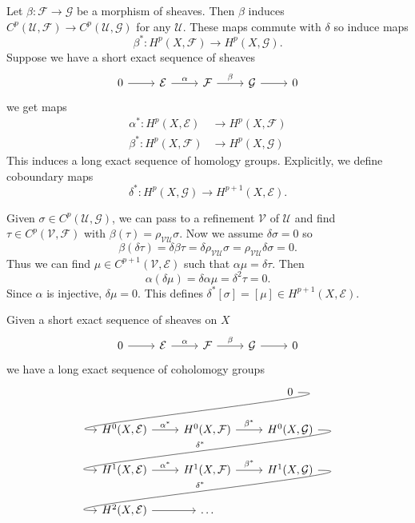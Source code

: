 \documentclass[a4paper]{article}
\begin{document}
Let \(\beta: \mathcal F \to \mathcal G\) be a morphism of sheaves. Then \(\beta\) induces \(C^p(\mathcal U, \mathcal F) \to C^p(\mathcal U, \mathcal G)\) for any \(\mathcal U\). These maps commute with \(\delta\) so induce maps
\[
  \beta^*: H^p(X, \mathcal F) \to H^p(X, \mathcal G).
\]
Suppose we have a short exact sequence of sheaves
\[
  \begin{tikzcd}
    0 \ar[r] & \mathcal E \ar[r, "\alpha"] & \mathcal F \ar[r, "\beta"] & \mathcal G \ar[r] & 0
  \end{tikzcd}
\]
we get maps
\begin{align*}
  \alpha^*: H^p(X, \mathcal E) &\to H^p(X, \mathcal F) \\
  \beta^*: H^p(X, \mathcal F) &\to H^p(X, \mathcal G)
\end{align*}
This induces a long exact sequence of homology groups. Explicitly, we define coboundary maps
\[
  \delta^*: H^p(X, \mathcal G) \to H^{p + 1}(X, \mathcal E).
\]

Given \(\sigma \in C^p(\mathcal U, \mathcal G)\), we can pass to a refinement \(\mathcal V\) of \(\mathcal U\) and find \(\tau \in C^p(\mathcal V, \mathcal F)\) with \(\beta(\tau) = \rho_{\mathcal V \mathcal U} \sigma\). Now we assume \(\delta \sigma = 0\) so
\[
  \beta(\delta \tau)
  = \delta \beta \tau
  = \delta \rho_{\mathcal V \mathcal U} \sigma
  = \rho_{\mathcal V \mathcal U} \delta \sigma
  = 0.
\]
Thus we can find \(\mu \in C^{p + 1}(\mathcal V, \mathcal E)\) such that \(\alpha \mu = \delta \tau\). Then
\[
  \alpha(\delta \mu) = \delta \alpha \mu = \delta^2 \tau = 0.
\]
Since \(\alpha\) is injective, \(\delta \mu = 0\). This defines \(\delta^*[\sigma] = [\mu] \in H^{p + 1}(X, \mathcal E)\).

\begin{theorem}
  Given a short exact sequence of sheaves on \(X\)
  \[
    \begin{tikzcd}
      0 \ar[r] & \mathcal E \ar[r, "\alpha"] & \mathcal F \ar[r, "\beta"] & \mathcal G \ar[r] & 0
    \end{tikzcd}
  \]
  we have a long exact sequence of coholomogy groups
  \[
    \begin{tikzcd}
      & & 0 \ar[dll, out=0, in=180] \\
      H^0(X, \mathcal E) \ar[r, "\alpha^*"] & H^0(X, \mathcal F) \ar[r, "\beta^*"] & H^0(X, \mathcal G) \ar[dll, "\delta^*"', out=0, in=180] \\
      H^1(X, \mathcal E) \ar[r, "\alpha^*"] & H^1(X, \mathcal F) \ar[r, "\beta^*"] & H^1(X, \mathcal G) \ar[dll, "\delta^*"', out=0, in=180] \\
      H^2(X, \mathcal E) \ar[r] & \dots
    \end{tikzcd}
  \]
\end{theorem}
\end{document}
